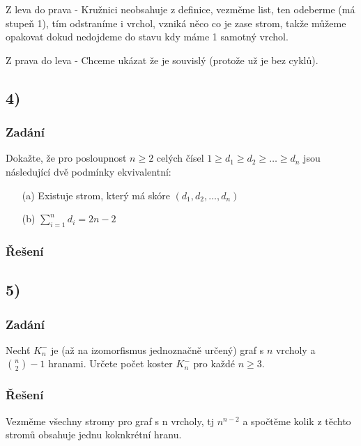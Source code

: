 \documentclass[../main.tex]{subfiles}
\begin{document}
Z leva do prava - Kružnici neobsahuje z definice, vezměme list, ten odeberme 
(má stupeň 1), tím odstraníme i vrchol, vzniká něco co je zase strom, takže můžeme
opakovat dokud nedojdeme do stavu kdy máme 1 samotný vrchol. 

Z prava do leva  -
Chceme ukázat že je souvislý (protože už je bez cyklů). 


\subsection*{4)}
\subsubsection*{Zadání}

Dokažte, že pro posloupnost $n\geq 2$ celých čísel 
$1\geq d_1\geq d_2 \geq \dots \geq d_n$ jsou následující
dvě podmínky ekvivalentní:
\begin{enumerate}
    \item[(a)] Existuje strom, který má skóre $(d_1, d_2, \dots, d_n)$
    \item[(b)] $\sum_{i=1}^n d_i = 2n - 2$
\end{enumerate}


\subsubsection*{Řešení}


\subsection*{5)}
\subsubsection*{Zadání}

Nechť $K_n^-$ je (až na izomorfismus jednoznačně určený) graf s $n$ vrcholy a $\binom{n}{2} -1$ hranami.
Určete počet koster $K_n^-$ pro každé $n\geq 3$.

\subsubsection*{Řešení}

Vezměme všechny stromy pro graf s n vrcholy, tj $n^{n-2}$ a spočtěme kolik z těchto stromů obsahuje jednu koknkrétní hranu.
\end{document}
